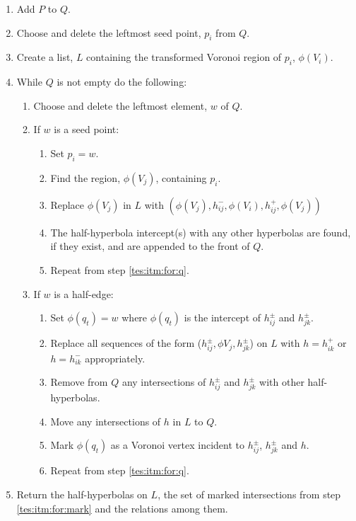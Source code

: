 \begin{enumerate}
  \item Add $P$ to $Q$.
  \item Choose and delete the leftmost seed point, $p_i$ from $Q$.
  \item Create a list, $L$ containing the transformed Voronoi region of $p_i$, $\phi(V_i)$.
  \item\label{tes:itm:for:q} While $Q$ is not empty do the following:
  \begin{enumerate}
    \item Choose and delete the leftmost element, $w$ of $Q$.
    \item If $w$ is a seed point:
    \begin{enumerate}
      \item Set $p_i=w$.
      \item Find the region, $\phi(V_j)$, containing $p_i$.
      \item Replace $\phi(V_j)$ in $L$ with $(\phi(V_j),h^-_{ij},\phi(V_i),h^+_{ij},\phi(V_j))$
      \item The half-hyperbola intercept(s) with any other hyperbolas are found, if they exist, and are appended to the front of $Q$.
      \item Repeat from step \ref{tes:itm:for:q}.
    \end{enumerate}
    \item If $w$ is a half-edge:
    \begin{enumerate}
      \item Set $\phi(q_t)=w$ where $\phi(q_t)$ is the intercept of $h^\pm_{ij}$ and $h^\pm_{jk}$.
      \item Replace all sequences of the form ($h^\pm_{ij},\phi{V_j},h^\pm_{jk}$) on $L$ with $h=h^+_{ik}$ or $h=h^-_{ik}$ appropriately.
      \item Remove from $Q$ any intersections of $h^\pm_{ij}$ and $h^\pm_{jk}$ with other half-hyperbolas.
      \item Move any intersections of $h$ in $L$ to $Q$.
      \item\label{tes:itm:for:mark} Mark $\phi(q_t)$ as a Voronoi vertex incident to $h^\pm_{ij}$, $h^\pm_{jk}$ and $h$.
      \item Repeat from step \ref{tes:itm:for:q}.
    \end{enumerate}
  \end{enumerate}
  \item Return the half-hyperbolas on $L$, the set of marked intersections from step \ref{tes:itm:for:mark} and the relations among them.
\end{enumerate}
